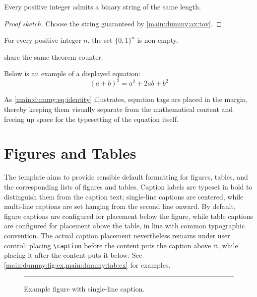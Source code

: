 \begin{theorem}\label{main:dummy:thm:toy}
  Every positive integer admits a binary string of the same length.
\end{theorem}
\begin{proof}[Proof sketch]
  Choose the string guaranteed by \cref{main:dummy:ax:toy}.
\end{proof}

\begin{corollary}\label{main:dummy:cor:toy}
  For every positive integer \(n\), the set \(\{0,1\}^n\) is non-empty.
\end{corollary}

\begin{claim}\label{main:dummy:clm:counter}
  share the same theorem counter.
\end{claim}

Below is an example of a displayed equation:
\begin{equation}\label{main:dummy:eq:identity}
  (a+b)^2 = a^2 + 2ab + b^2
\end{equation}

As \cref{main:dummy:eq:identity} illustrates, equation tags are placed in the
margin, thereby keeping them visually separate from the mathematical content and
freeing up space for the typesetting of the equation itself.

\section{Figures and Tables}\label{main:dummy:figtab}

The template aims to provide sensible default formatting for figures, tables,
and the corresponding lists of figures and tables. Caption labels
are typeset in bold to distinguish them from the caption text; single-line
captions are centered, while multi-line captions are set hanging from the second
line onward. By default, figure captions are configured for placement below the
figure, while table captions are configured for placement above the table, in
line with common typographic convention. The actual caption placement nevertheless
remains under user control: placing \verb|\caption| before the content puts the
caption above it, while placing it after the content puts it below.
See \cref{main:dummy:fig:ex,main:dummy:tab:ex} for examples.

\begin{figure}
  \centering
  \colorbox{T-Q-B0}{\rule[4em]{4em}{0pt}}
  \caption{Example figure with single-line caption.}
  \label{main:dummy:fig:ex}
\end{figure}

